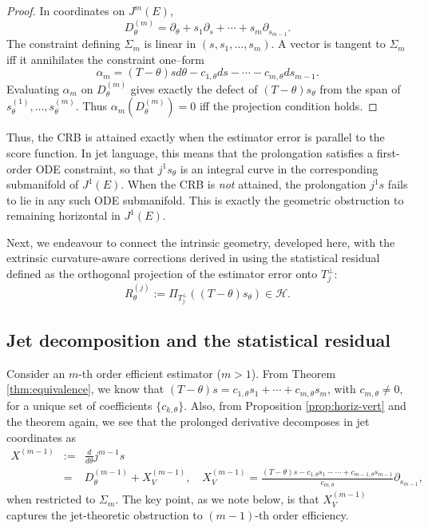 \documentclass[3p,times]{elsarticle}
\begin{document}
\begin{proof}
In coordinates on $J^m(E)$,
\[
D_\theta^{(m)}=
\partial_\theta +
s_1\partial_s +
\cdots +
s_m\partial_{s_{m-1}}.
\]
The constraint defining $\Sigma_m$ is linear in $(s,s_1,\dots,s_m)$.  A
vector is tangent to $\Sigma_m$ iff it annihilates the constraint
one--form
\[
\alpha_m
=
(T-\theta)sd\theta - c_{1,\theta}ds - \cdots - c_{m,\theta}ds_{m-1}.
\]
Evaluating $\alpha_m$ on $D_\theta^{(m)}$ gives exactly the defect of
$(T-\theta)s_\theta$ from the span of $s_\theta^{(1)},\dots,s_\theta^{(m)}$.
Thus $\alpha_m(D_\theta^{(m)})=0$ iff the projection condition holds.
\end{proof}
Thus, the CRB is attained exactly when the estimator error is
parallel to the score function.  
In jet language, this means that the prolongation satisfies a first-order ODE constraint,
so that $j^{1}s_\theta$ is an integral curve in the corresponding submanifold of $J^{1}(E)$.
When the CRB is \emph{not} attained, the prolongation $j^{1}s$ fails to lie in any such ODE 
submanifold.  
This is exactly the geometric obstruction to remaining horizontal in $J^{1}(E)$.

Next, we endeavour to connect the intrinsic geometry, developed here, with the extrinsic curvature-aware corrections derived in \cite{SRK, srkvector} using the statistical residual defined as the orthogonal projection of the estimator error onto \(T_j^\perp\):
\[
R^{(j)}_\theta
:=
\Pi_{T_j^\perp}((T-\theta)s_\theta)
\in \mathcal{H}.
\]
\subsection{Jet decomposition and the statistical residual}
Consider an $m$-th order efficient estimator (\(m> 1\)). From Theorem \ref{thm:equivalence}, we know that \((T-\theta)s=c_{1,\theta}s_1+\cdots+c_{m,\theta}s_m\), with \(c_{m,\theta}\neq 0\), for a unique set of coefficients \(\{c_{k,\theta}\}\). Also, from Proposition \ref{prop:horiz-vert} and the theorem again, we see that the prolonged derivative decomposes in jet coordinates as
\begin{eqnarray*}
X^{(m-1)}&:=&\frac{d}{d\theta}j^{m-1} s\\
&=&
D_\theta^{(m-1)} + X_V^{(m-1)},
\quad
X_V^{(m-1)} = \frac{(T-\theta)s-c_{1,\theta}s_1-\cdots+c_{m-1,\theta}s_{m-1}}{c_{m,\theta}}\partial_{s_{m-1}},
\end{eqnarray*}
when restricted to \(\Sigma_m\).
The key point, as we note below, is that
\(X_V^{(m-1)}\) captures the jet-theoretic obstruction to 
\((m-1)\)-th order efficiency.
\end{document}
